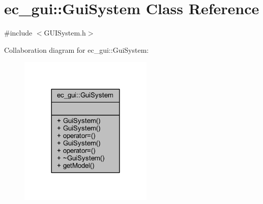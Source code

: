 \hypertarget{classec__gui_1_1_gui_system}{}\section{ec\+\_\+gui\+:\+:Gui\+System Class Reference}
\label{classec__gui_1_1_gui_system}


{\ttfamily \#include $<$G\+U\+I\+System.\+h$>$}



Collaboration diagram for ec\+\_\+gui\+:\+:Gui\+System\+:\nopagebreak
\begin{figure}[H]
\begin{center}
\leavevmode
\includegraphics[width=180pt]{classec__gui_1_1_gui_system__coll__graph}
\end{center}
\end{figure}
